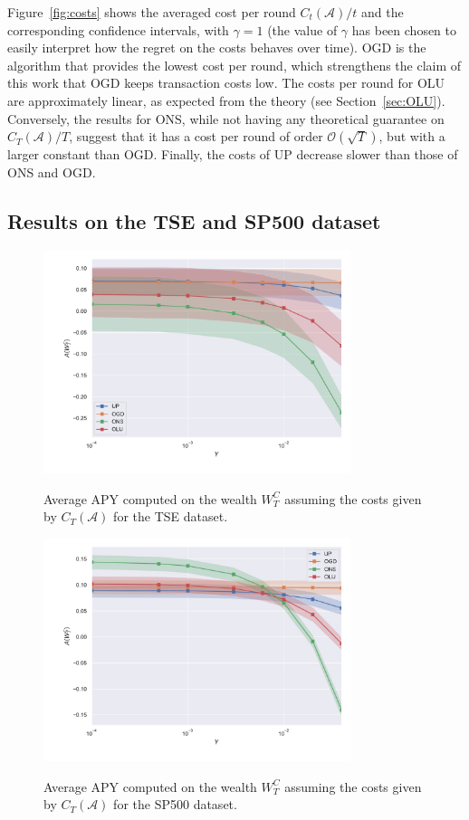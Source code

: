 Figure~\ref{fig:costs} shows the averaged cost per round $C_t(\mathcal{A})/t$ and the corresponding confidence intervals, with $\gamma = 1$ (the value of $\gamma$ has been chosen to easily interpret how the regret on the costs behaves over time).
OGD is the algorithm that provides the lowest cost per round, which strengthens the claim of this work that OGD keeps transaction costs low.
The costs per round for OLU are approximately linear, as expected from the theory (see Section~\ref{sec:OLU}).
Conversely, the results for ONS, while not having any theoretical guarantee on $C_T(\mathcal{A})/T$, suggest that it has a cost per round of order $\mathcal{O}(\sqrt{T})$, but with a larger constant than OGD.
Finally, the costs of UP decrease slower than those of ONS and OGD.

\subsection{Results on the TSE and SP500 dataset}

\begin{figure}[ht!]
\centering
{\includegraphics[width=0.80\textwidth,keepaspectratio]{img/fig_w_decay_l1_tse.pdf}} 
\caption{Average APY computed on the wealth $W_T^C$ assuming the costs given by $C_T(\mathcal{A})$ for the TSE dataset.}
\label{fig:wealth_decay_l1_tse}
\end{figure}

\begin{figure}[ht!]
\centering
{\includegraphics[width=0.80\textwidth,keepaspectratio]{img/fig_w_decay_l1_sp500.pdf}} 
\caption{Average APY computed on the wealth $W_T^C$ assuming the costs given by $C_T(\mathcal{A})$ for the SP500 dataset.}
\label{fig:wealth_decay_l1_sp500}
\end{figure}


